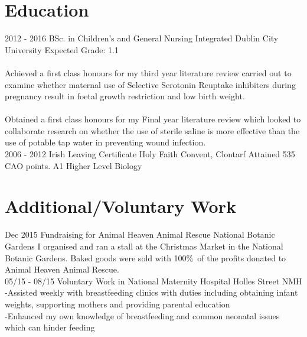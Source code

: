 \documentclass[]{friggeri-cv}
\begin{document}
\section{Education}
\begin{entrylist}
  \entry
    {2012 - 2016}
    {BSc. in Children’s and General Nursing Integrated}
    {Dublin City University}
    {Expected Grade: 1.1\\\\
Achieved a first class honours for my third year literature review carried out to examine whether maternal use of Selective Serotonin Reuptake inhibiters during pregnancy result in foetal growth restriction and low birth weight.\\\\
Obtained a first class honours for my Final year literature review which looked to collaborate research on whether the use of sterile saline is more effective than the use of potable tap water in preventing wound infection.
\\}
  \entry
    {2006 - 2012}
    {Irish Leaving Certificate}
    {Holy Faith  Convent, Clontarf}
    {Attained 535 CAO points. A1 Higher Level Biology}
\end{entrylist}

\newpage

\section{Additional/Voluntary Work}
\begin{entrylist}
  \entry
    {Dec 2015}
    {Fundraising for Animal Heaven Animal Rescue}
    {National Botanic Gardens}
    {I organised and ran a stall at the Christmas Market in the National Botanic Gardens. Baked goods were sold with 100\%\ of the profits donated to Animal Heaven Animal Rescue.\\}
  \entry
    {05/15 - 08/15}
    {Voluntary Work in National Maternity Hospital}
    {Holles Street NMH}
    {-Assisted weekly with breastfeeding clinics with duties including obtaining infant weights, supporting mothers and providing parental education\\
 -Enhanced my own knowledge of breastfeeding and common neonatal issues which can
hinder feeding\\
}
\end{entrylist}
\end{document}
